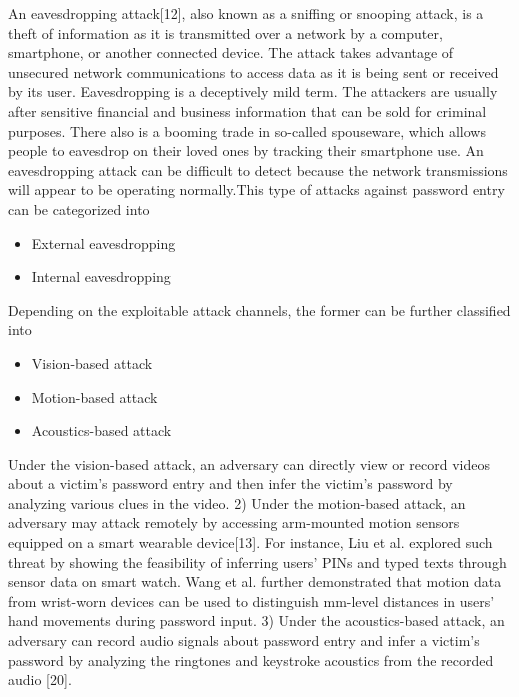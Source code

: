 \documentclass[12pt,a4paper,oneside]{report}
\begin{document}
An eavesdropping attack[12], also known as a sniffing or snooping attack, is a theft of information as it is transmitted over a network by a computer, smartphone, or another connected device.
The attack takes advantage of unsecured network communications to access data as it is being sent or received by its user.
Eavesdropping is a deceptively mild term. The attackers are usually after sensitive financial and business information that can be sold for criminal purposes. There also is a booming trade in so-called spouseware, which allows people to eavesdrop on their loved ones by tracking their smartphone use.
An eavesdropping attack can be difficult to detect because the network transmissions will appear to be operating normally.\newline This type of attacks against password entry can be categorized into 
\begin{itemize}
    \item External eavesdropping
    \item Internal eavesdropping
\end{itemize}
 Depending on the exploitable
attack channels, the former can be further classified into
\begin{itemize}
    \item Vision-based attack
    \item Motion-based attack
    \item Acoustics-based attack
\end{itemize}
 Under the vision-based attack, an adversary can
directly view or record videos about a victim’s password entry
and then infer the victim’s password by analyzing various
clues in the video. 2) Under the motion-based attack,
an adversary may attack remotely by accessing arm-mounted
motion sensors equipped on a smart wearable device[13]. For instance, Liu et al. explored such threat by
showing the feasibility of inferring users’ PINs and typed texts
through sensor data on smart watch. Wang et al. further
demonstrated that motion data from wrist-worn devices can be
used to distinguish mm-level distances in users’ hand movements during password input. 3) Under the acoustics-based
attack, an adversary can record audio signals about password
entry and infer a victim’s password by analyzing the ringtones
and keystroke acoustics from the recorded audio [20].
\end{document}
